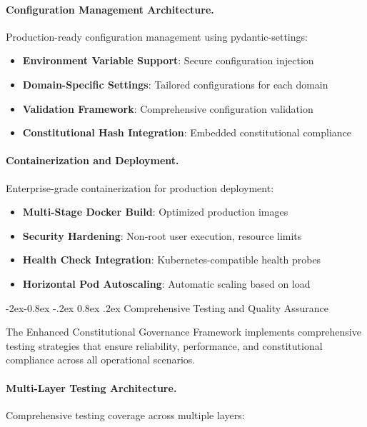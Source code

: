 \documentclass[manuscript,screen,9pt]{acmart}
\makeatletter
\renewcommand\subsubsection{\@startsection{subsubsection}{3}{\z@}%
  {-2ex\@plus -0.8ex \@minus -.2ex}%
  {0.8ex \@plus .2ex}%
  {\normalfont\normalsize\bfseries}}
\makeatother
\begin{document}
\paragraph{Configuration Management Architecture.}
Production-ready configuration management using pydantic-settings:

\begin{itemize}[itemsep=1pt,parsep=1pt]
    \item \textbf{Environment Variable Support}: Secure configuration injection
    \item \textbf{Domain-Specific Settings}: Tailored configurations for each domain
    \item \textbf{Validation Framework}: Comprehensive configuration validation
    \item \textbf{Constitutional Hash Integration}: Embedded constitutional compliance
\end{itemize}

\paragraph{Containerization and Deployment.}
Enterprise-grade containerization for production deployment:

\begin{itemize}[itemsep=1pt,parsep=1pt]
    \item \textbf{Multi-Stage Docker Build}: Optimized production images
    \item \textbf{Security Hardening}: Non-root user execution, resource limits
    \item \textbf{Health Check Integration}: Kubernetes-compatible health probes
    \item \textbf{Horizontal Pod Autoscaling}: Automatic scaling based on load
\end{itemize}

\subsubsection{Comprehensive Testing and Quality Assurance}
\label{subsubsec:testing_quality_assurance}

The Enhanced Constitutional Governance Framework implements comprehensive testing strategies that ensure reliability, performance, and constitutional compliance across all operational scenarios.

\paragraph{Multi-Layer Testing Architecture.}
Comprehensive testing coverage across multiple layers:
\end{document}
